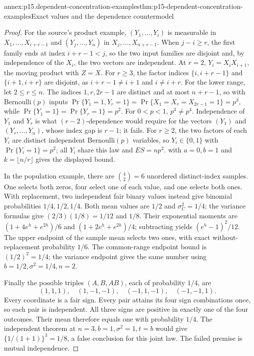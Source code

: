 \begin{annexitem}{annex:p15.dependent-concentration-examples}{thm:p15-dependent-concentration-examples}{Exact values and the dependence countermodel}
\begin{proof}
For the source's product example, \((Y_1,\ldots,Y_i)\) is measurable in
\(X_1,\ldots,X_{i+r-1}\) and \((Y_j,\ldots,Y_n)\) in
\(X_j,\ldots,X_{n+r-1}\). When \(j-i\geq r\), the first family ends at
index \(i+r-1<j\), so the two input families are disjoint and,
by independence of the \(X_i\), the two vectors are independent.
At \(r=2\), \(Y_i=X_iX_{i+1}\), the moving product with \(Z=X\).
For \(r\geq3\), the factor indices \(\{i,i+r-1\}\) and
\(\{i+1,i+r\}\) are disjoint, as \(i+r-1\neq i+1\) and
\(i\neq i+r\).
For the lower range, let \(2\leq r\leq n\). The indices \(1,r,2r-1\)
are distinct and at most \(n+r-1\), so with Bernoulli\((p)\) inputs
\(\Pr\{Y_1=1,Y_r=1\}=\Pr\{X_1=X_r=X_{2r-1}=1\}=p^3\), while
\(\Pr\{Y_1=1\}=\Pr\{Y_r=1\}=p^2\). For \(0<p<1\), \(p^3\neq p^4\).
Independence of \(Y_1\) and \(Y_r\) is what \((r-2)\)-dependence would
require for the vectors \((Y_1)\) and \((Y_r,\ldots,Y_n)\), whose index
gap is \(r-1\); it fails.
For \(r\geq2\), the two factors of each \(Y_i\) are distinct independent
Bernoulli\((p)\) variables, so \(Y_i\in\{0,1\}\) with
\(\Pr\{Y_i=1\}=p^2\); all \(Y_i\) share this law and \(ES=np^2\).
 with \(a=0,b=1\) and
\(k=\lfloor n/r\rfloor\) gives the displayed bound.

In the population example, there are \(\binom42=6\) unordered
distinct-index samples. One selects both zeros, four select one of
each value, and one selects both ones. With replacement, two independent
fair binary values instead give binomial probabilities \(1/4,1/2,1/4\).
Both mean values are \(1/2\) and \(\sigma_C^2=1/4\);
the variance formulas give \((2/3)(1/8)=1/12\) and \(1/8\).
Their exponential moments are
\((1+4e^h+e^{2h})/6\) and \((1+2e^h+e^{2h})/4\);
subtracting yields \((e^h-1)^2/12\).
The upper endpoint of the sample mean selects two ones, with exact
without-replacement probability \(1/6\).
The common-range endpoint bound is \((1/2)^2=1/4\);
the variance endpoint gives the same number using
\(b=1/2,\sigma^2=1/4,n=2\).

Finally the possible triples \((A,B,AB)\), each of probability \(1/4\),
are
\[
 (1,1,1),\quad(1,-1,-1),\quad(-1,1,-1),\quad(-1,-1,1).
\]
Every coordinate is a fair sign. Every pair attains its four sign
combinations once, so each pair is independent.
All three signs are positive in exactly one of the four outcomes.
Their mean therefore equals one with probability \(1/4\).
The independent theorem at \(n=3,b=1,\sigma^2=1,t=b\) would give
\(\{1/(1+1)\}^3=1/8\), a false conclusion for this joint law.
The failed premise is mutual independence.
\end{proof}
\end{annexitem}
